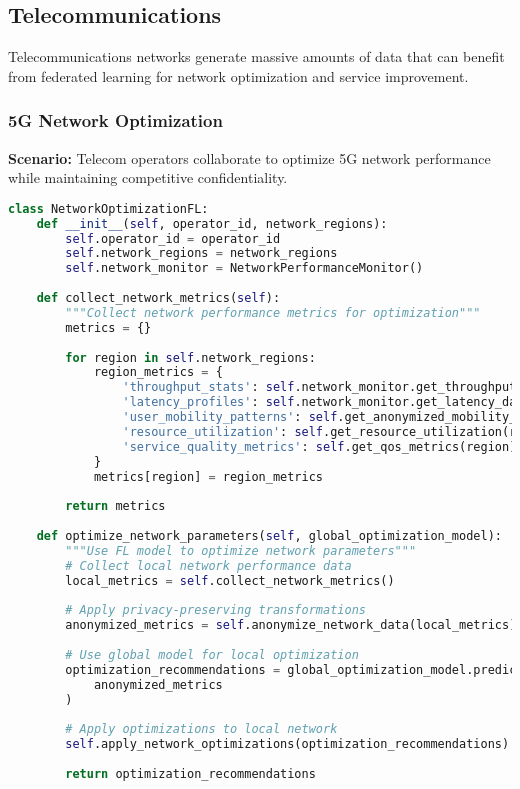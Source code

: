\subsection{Telecommunications}

Telecommunications networks generate massive amounts of data that can benefit from federated learning for network optimization and service improvement.

\subsubsection{5G Network Optimization}

\textbf{Scenario:} Telecom operators collaborate to optimize 5G network performance while maintaining competitive confidentiality.

\begin{lstlisting}[language=python, caption=5G Network Optimization FL]
class NetworkOptimizationFL:
    def __init__(self, operator_id, network_regions):
        self.operator_id = operator_id
        self.network_regions = network_regions
        self.network_monitor = NetworkPerformanceMonitor()
        
    def collect_network_metrics(self):
        """Collect network performance metrics for optimization"""
        metrics = {}
        
        for region in self.network_regions:
            region_metrics = {
                'throughput_stats': self.network_monitor.get_throughput_data(region),
                'latency_profiles': self.network_monitor.get_latency_data(region),
                'user_mobility_patterns': self.get_anonymized_mobility_data(region),
                'resource_utilization': self.get_resource_utilization(region),
                'service_quality_metrics': self.get_qos_metrics(region)
            }
            metrics[region] = region_metrics
            
        return metrics
        
    def optimize_network_parameters(self, global_optimization_model):
        """Use FL model to optimize network parameters"""
        # Collect local network performance data
        local_metrics = self.collect_network_metrics()
        
        # Apply privacy-preserving transformations
        anonymized_metrics = self.anonymize_network_data(local_metrics)
        
        # Use global model for local optimization
        optimization_recommendations = global_optimization_model.predict(
            anonymized_metrics
        )
        
        # Apply optimizations to local network
        self.apply_network_optimizations(optimization_recommendations)
        
        return optimization_recommendations
\end{lstlisting}

